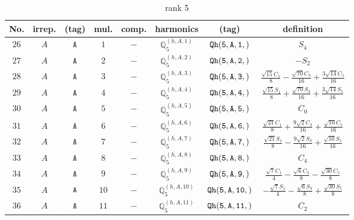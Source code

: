 \documentclass[fleqn,8pt]{jsarticle}
\begin{document}
\begin{table}[ht!]
\begin{center}
\caption{rank 5}
\renewcommand{\arraystretch}{1.3}
\begin{tabular}{cccccccc} \hline \hline
No. & irrep. & (tag) & mul. & comp. & harmonics & (tag) & definition \\ \hline
$ 26 $ & $ A $ & $ {\tt A} $ & $ 1 $ & $ - $ & $ \mathbb{Q}_{5}^{(h,A,1)} $ & $ {\tt Qh(5,A,1,)} $ & $ S_{4} $ \\
$ 27 $ & $ A $ & $ {\tt A} $ & $ 2 $ & $ - $ & $ \mathbb{Q}_{5}^{(h,A,2)} $ & $ {\tt Qh(5,A,2,)} $ & $ - S_{2} $ \\
$ 28 $ & $ A $ & $ {\tt A} $ & $ 3 $ & $ - $ & $ \mathbb{Q}_{5}^{(h,A,3)} $ & $ {\tt Qh(5,A,3,)} $ & $ \frac{\sqrt{15} C_{1}}{8} - \frac{\sqrt{70} C_{3}}{16} + \frac{3 \sqrt{14} C_{5}}{16} $ \\
$ 29 $ & $ A $ & $ {\tt A} $ & $ 4 $ & $ - $ & $ \mathbb{Q}_{5}^{(h,A,4)} $ & $ {\tt Qh(5,A,4,)} $ & $ \frac{\sqrt{15} S_{1}}{8} + \frac{\sqrt{70} S_{3}}{16} + \frac{3 \sqrt{14} S_{5}}{16} $ \\
$ 30 $ & $ A $ & $ {\tt A} $ & $ 5 $ & $ - $ & $ \mathbb{Q}_{5}^{(h,A,5)} $ & $ {\tt Qh(5,A,5,)} $ & $ C_{0} $ \\
$ 31 $ & $ A $ & $ {\tt A} $ & $ 6 $ & $ - $ & $ \mathbb{Q}_{5}^{(h,A,6)} $ & $ {\tt Qh(5,A,6,)} $ & $ \frac{\sqrt{21} C_{1}}{8} + \frac{9 \sqrt{2} C_{3}}{16} + \frac{\sqrt{10} C_{5}}{16} $ \\
$ 32 $ & $ A $ & $ {\tt A} $ & $ 7 $ & $ - $ & $ \mathbb{Q}_{5}^{(h,A,7)} $ & $ {\tt Qh(5,A,7,)} $ & $ \frac{\sqrt{21} S_{1}}{8} - \frac{9 \sqrt{2} S_{3}}{16} + \frac{\sqrt{10} S_{5}}{16} $ \\
$ 33 $ & $ A $ & $ {\tt A} $ & $ 8 $ & $ - $ & $ \mathbb{Q}_{5}^{(h,A,8)} $ & $ {\tt Qh(5,A,8,)} $ & $ C_{4} $ \\
$ 34 $ & $ A $ & $ {\tt A} $ & $ 9 $ & $ - $ & $ \mathbb{Q}_{5}^{(h,A,9)} $ & $ {\tt Qh(5,A,9,)} $ & $ \frac{\sqrt{7} C_{1}}{4} - \frac{\sqrt{6} C_{3}}{8} - \frac{\sqrt{30} C_{5}}{8} $ \\
$ 35 $ & $ A $ & $ {\tt A} $ & $ 10 $ & $ - $ & $ \mathbb{Q}_{5}^{(h,A,10)} $ & $ {\tt Qh(5,A,10,)} $ & $ - \frac{\sqrt{7} S_{1}}{4} - \frac{\sqrt{6} S_{3}}{8} + \frac{\sqrt{30} S_{5}}{8} $ \\
$ 36 $ & $ A $ & $ {\tt A} $ & $ 11 $ & $ - $ & $ \mathbb{Q}_{5}^{(h,A,11)} $ & $ {\tt Qh(5,A,11,)} $ & $ C_{2} $ \\
 \hline \hline
\end{tabular}
\end{center}
\end{table}
\end{document}
